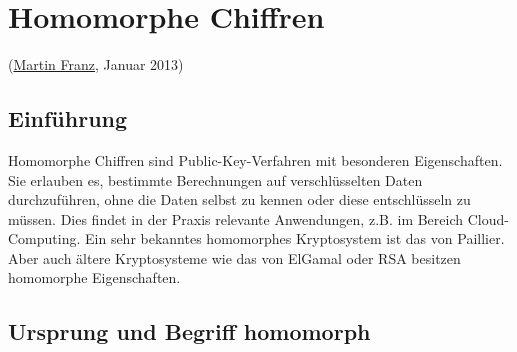 
\begin{refsegment}

\hypertarget{Chapter_HomomorphicCiphers}{}
\chapter{Homomorphe Chiffren}
\label{Chapter_HomomorphicCiphers}
(\hyperlink{author_Martin-Franz}{Martin Franz}, Januar 2013)

\section{Einführung}

Homomorphe Chiffren sind Public-Key-Verfahren mit besonderen Eigenschaften. Sie erlauben es, bestimmte Berechnungen auf verschlüsselten Daten durchzuführen, ohne die Daten selbst zu kennen oder diese entschlüsseln zu müssen. Dies findet in der Praxis relevante Anwendungen, z.B. im Bereich Cloud-Computing. Ein sehr bekanntes homomorphes Kryptosystem ist das von Paillier. Aber auch ältere Kryptosysteme wie das von ElGamal oder RSA besitzen homomorphe Eigenschaften.


\section{Ursprung und Begriff \glqq homomorph\grqq}


\end{refsegment}
